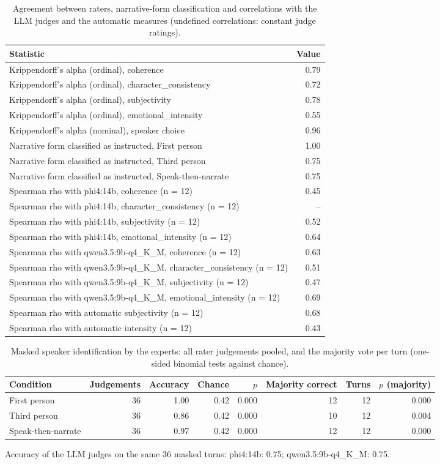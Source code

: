 \documentclass[10pt]{article}
\begin{document}
{\scriptsize
\begin{longtable}{lr}
\caption{Agreement between raters, narrative-form classification and correlations with the LLM judges and the automatic measures (undefined correlations: constant judge ratings).}\\
\toprule
Statistic & Value \\
\midrule
\endhead
Krippendorff's alpha (ordinal), coherence & 0.79 \\
Krippendorff's alpha (ordinal), character\_consistency & 0.72 \\
Krippendorff's alpha (ordinal), subjectivity & 0.78 \\
Krippendorff's alpha (ordinal), emotional\_intensity & 0.55 \\
Krippendorff's alpha (nominal), speaker choice & 0.96 \\
Narrative form classified as instructed, First person & 1.00 \\
Narrative form classified as instructed, Third person & 0.75 \\
Narrative form classified as instructed, Speak-then-narrate & 0.75 \\
Spearman rho with phi4:14b, coherence (n = 12) & 0.45 \\
Spearman rho with phi4:14b, character\_consistency (n = 12) & -- \\
Spearman rho with phi4:14b, subjectivity (n = 12) & 0.52 \\
Spearman rho with phi4:14b, emotional\_intensity (n = 12) & 0.64 \\
Spearman rho with qwen3.5:9b-q4\_K\_M, coherence (n = 12) & 0.63 \\
Spearman rho with qwen3.5:9b-q4\_K\_M, character\_consistency (n = 12) & 0.51 \\
Spearman rho with qwen3.5:9b-q4\_K\_M, subjectivity (n = 12) & 0.47 \\
Spearman rho with qwen3.5:9b-q4\_K\_M, emotional\_intensity (n = 12) & 0.69 \\
Spearman rho with automatic subjectivity (n = 12) & 0.68 \\
Spearman rho with automatic intensity (n = 12) & 0.43 \\
\bottomrule
\end{longtable}
}


{\scriptsize
\begin{longtable}{lrrrrrrr}
\caption{Masked speaker identification by the experts: all rater judgements pooled, and the majority vote per turn (one-sided binomial tests against chance).}\\
\toprule
Condition & Judgements & Accuracy & Chance & $p$ & Majority correct & Turns & $p$ (majority) \\
\midrule
\endhead
First person & 36 & 1.00 & 0.42 & 0.000 & 12 & 12 & 0.000 \\
Third person & 36 & 0.86 & 0.42 & 0.000 & 10 & 12 & 0.004 \\
Speak-then-narrate & 36 & 0.97 & 0.42 & 0.000 & 12 & 12 & 0.000 \\
\bottomrule
\end{longtable}
}


Accuracy of the LLM judges on the same 36 masked turns: phi4:14b: 0.75; qwen3.5:9b-q4\_K\_M: 0.75.
\end{document}
